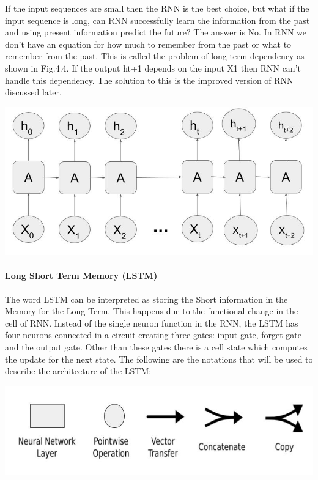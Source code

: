 If the input sequences are small then the RNN is the best choice, but what if the input sequence is long, can RNN successfully learn the information from the past and using present information predict the future? The answer is No. In RNN we don’t have an equation for how much to remember from the past or what to remember from the past. This is called the problem of long term dependency \cite{12} as shown in Fig.4.4. If the output ht+1 depends on the input X1 then RNN can’t handle this dependency. The solution to this is the improved version of RNN discussed later.

				\begin{center}
				\includegraphics[width=\linewidth]{figures/Problem-of-Long-Term-Dependency.jpg}	
				\label{fig: Long term dependency problem}
				\end{center}



\paragraph{Long Short Term Memory (LSTM)}

The word LSTM \cite{12} can be interpreted as storing the Short information in the Memory for the Long Term. This happens due to the functional change in the cell of RNN. Instead of the single neuron function in the RNN, the LSTM has four neurons connected in a circuit creating three gates: input gate, forget gate and the output gate. Other than these gates there is a cell state which computes the update for the next state. The following are the notations that will be used to describe the architecture of the LSTM:

				\begin{center}
				\includegraphics[width=\linewidth]{figures/Notations.jpg}	
				\label{fig: Notations}
				\end{center}

